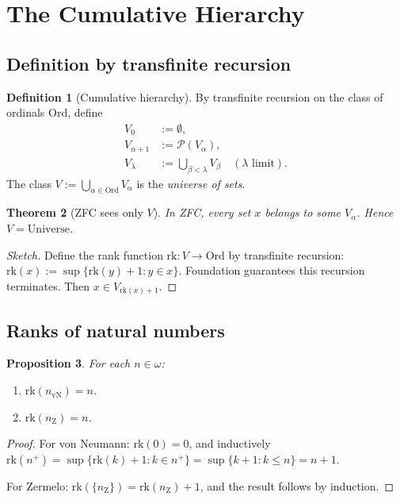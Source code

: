 \documentclass[12pt]{article}
\newtheorem{theorem}{Theorem}[section]
\newtheorem{proposition}[theorem]{Proposition}
\theoremstyle{definition}
\newtheorem{definition}[theorem]{Definition}
\theoremstyle{remark}
\begin{document}
\section{The Cumulative Hierarchy}
\label{sec:cumulative}

\subsection{Definition by transfinite recursion}

\begin{definition}[Cumulative hierarchy]\label{def:Valpha}
By transfinite recursion on the class of ordinals $\mathrm{Ord}$, define
\begin{align}
V_0 &:= \emptyset, \\
V_{\alpha+1} &:= \mathcal{P}(V_\alpha), \\
V_\lambda &:= \bigcup_{\beta < \lambda} V_\beta \quad (\lambda \text{ limit}).
\end{align}
The class $V := \bigcup_{\alpha \in \mathrm{Ord}} V_\alpha$ is the
\emph{universe of sets}.
\end{definition}

\begin{theorem}[ZFC sees only $V$]\label{thm:V-is-everything}
In ZFC, every set $x$ belongs to some $V_\alpha$. Hence $V = \mathrm{Universe}$.
\end{theorem}

\begin{proof}[Sketch]
Define the rank function $\mathrm{rk}: V \to \mathrm{Ord}$ by transfinite
recursion: $\mathrm{rk}(x) := \sup\{\mathrm{rk}(y) + 1 : y \in x\}$.
Foundation guarantees this recursion terminates. Then
$x \in V_{\mathrm{rk}(x) + 1}$.
\end{proof}

\subsection{Ranks of natural numbers}

\begin{proposition}\label{prop:ranks}
For each $n \in \omega$:
\begin{enumerate}
\item $\mathrm{rk}(n_{\mathrm{vN}}) = n$.
\item $\mathrm{rk}(n_{\mathrm{Z}}) = n$.
\end{enumerate}
\end{proposition}

\begin{proof}
For von Neumann: $\mathrm{rk}(0) = 0$, and inductively
$\mathrm{rk}(n^+) = \sup\{\mathrm{rk}(k) + 1 : k \in n^+\} = \sup\{k+1 : k \leq n\} = n+1$.

For Zermelo: $\mathrm{rk}(\{n_{\mathrm{Z}}\}) = \mathrm{rk}(n_{\mathrm{Z}}) + 1$, and
the result follows by induction.
\end{proof}
\end{document}
